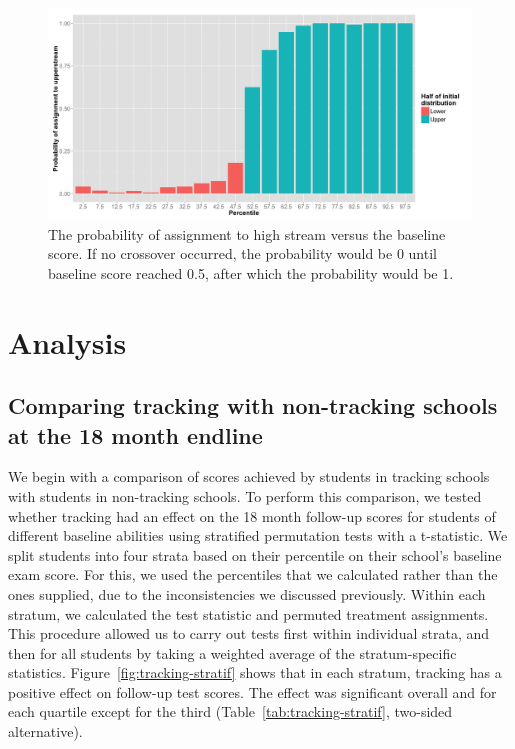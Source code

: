 \documentclass[11pt]{article}
\begin{document}
 
  
  \begin{figure}[ht]
 \centering
 \includegraphics[scale=0.4]{tmt_assignment.png}
 \caption{The probability of assignment to high stream versus the baseline score. If no crossover occurred, the probability would be 0 until baseline score reached 0.5, after which the probability would be 1.}
 \label{fig:crossover}
 \end{figure} 
 
 
 \section{Analysis}
 \subsection{Comparing tracking with non-tracking schools at the 18 month endline}

We begin with a comparison of scores achieved by students in tracking schools with students in non-tracking schools. To perform this comparison, we tested whether tracking had an effect on the 18 month follow-up scores for students of different baseline abilities using stratified permutation tests with a t-statistic. We split students into four strata based on their percentile on their school's baseline exam score.  For this, we used the percentiles that we calculated rather than the ones supplied, due to the inconsistencies we discussed previously.  Within each stratum, we calculated the test statistic and permuted treatment assignments.  This procedure allowed us to carry out tests first within individual strata, and then for all students by taking a weighted average of the stratum-specific statistics.  Figure~\ref{fig:tracking-stratif} shows that in each stratum, tracking has a positive effect on follow-up test scores.  The effect was significant overall and for each quartile except for the third (Table~\ref{tab:tracking-stratif}, two-sided alternative). \\
\end{document}
